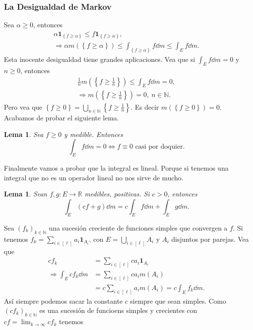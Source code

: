 \documentclass[12pt]{article}
\theoremstyle{plain}
\newtheorem{Lem}[Th]{Lema}             %
\theoremstyle{definition}
\theoremstyle{remark}
\numberwithin{equation}{section}
\newcommand{\bN}{\mathbb{N}}        %
\newcommand{\bR}{\mathbb{R}}        %
\newcommand{\ind}{\mathbf{1}}       %
\renewcommand{\geq}{\geqslant}      %
\renewcommand{\leq}{\leqslant}      %
\renewcommand{\:}{\colon}           %
\newcommand{\conj}[1]{\left\lbrace#1\right\rbrace}
\newcommand{\bonj}[1]{\left\lbrack#1\right\rbrack}
\begin{document}
\begin{multicols}{2}
\subsubsection*{La Desigualdad de Markov}

Sea $\alpha\geq 0$, entonces
\begin{gather*}
  \alpha\ind_{\conj{f\geq \alpha}}\leq f\ind_{\conj{f\geq \alpha}},\\
  \Rightarrow \alpha m(\conj{f\geq \alpha})\leq \int_{\conj{f\geq \alpha}}f\dd m\leq \int_{E}f\dd m.
\end{gather*}
Esta inocente desigualdad tiene grandes aplicaciones. Vea que si $\int_{E}f\dd m=0$ y $n\geq 0$, entonces
\begin{gather*}
  \frac{1}{n}m\left(\conj{f\geq \frac{1}{n}}\right)\leq \int_Ef\dd m=0,\\
  \Rightarrow m\left(\conj{f\geq \frac{1}{n}}\right)=0,\ n\in\bN.
\end{gather*}
Pero vea que $\conj{f\geq 0}=\bigcup_{n\in\bN}\conj{f\geq \frac{1}{n}}$. Es decir $m(\conj{f\geq 0})=0.$ Acabamos de probar el siguiente lema.

\begin{Lem}
  Sea $f\geq 0$ y medible. Entonces
  $$\int_Ef\dd m=0 \iff f\equiv 0\text{ casi por doquier}.$$
\end{Lem}

Finalmente vamos a probar que la integral es lineal. Porque si tenemos una integral que no es un operador lineal no nos sirve de mucho.

\begin{Lem}\label{lem:LebesgueIntLineal}
  Sean $f,g\:E\to\bR$ medibles, positivas. Si $c>0$, entonces
  $$\int_E(cf+g)\dd m=c\int_E f\dd m+\int_Eg\dd m.$$
\end{Lem}

\begin{ptcbp}
Sea $(f_k)_{k\in\bN}$ una sucesión creciente de funciones simples que convergen a $f$. Si tenemos
$f_k=\sum_{i\in\bonj{\ell}}a_i\ind_{A_i}$, con $E=\bigcup_{i\in\bonj{\ell}}A_i$ y $A_i$ disjuntos por parejas. Vea que
\begin{align*}
  cf_k &=\sum_{i\in\bonj{\ell}}ca_i\ind_{A_i}\\
  \Rightarrow\int_Ecf_k\dd m&=\sum_{i\in\bonj{\ell}}ca_im(A_i)\\%
  &=c\sum_{i\in\bonj{\ell}}a_im(A_i)=c\int_Ef_k\dd m.
\end{align*}
Así siempre podemos sacar la constante $c$ siempre que sean simples. Como $(cf_k)_{k\in\bN}$ es una sucesión de funcioens simples y crecientes con $cf=\lim_{k\to\infty}cf_k$ tenemos


\end{ptcbp}
\end{multicols}
\end{document}
